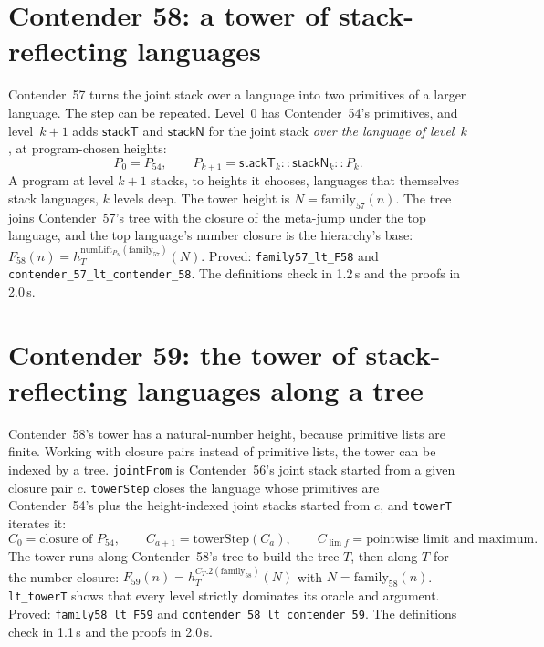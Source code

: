 \documentclass[11pt]{article}
\theoremstyle{definition}
\theoremstyle{remark}
\newcommand{\lean}[1]{\texttt{#1}}
\begin{document}
\section{Contender 58: a tower of stack-reflecting languages}

Contender~57 turns the joint stack over a language into two primitives of a
larger language. The step can be repeated. Level~0 has Contender~54's
primitives, and level~$k{+}1$ adds $\mathsf{stackT}$ and $\mathsf{stackN}$
for the joint stack \emph{over the language of level~$k$}, at program-chosen
heights:
\[
P_0=P_{54},\qquad P_{k+1}=\mathsf{stackT}_k::\mathsf{stackN}_k::P_k .
\]
A program at level $k{+}1$ stacks, to heights it chooses, languages that
themselves stack languages, $k$ levels deep. The tower height is
$N=\mathrm{family}_{57}(n)$. The tree joins Contender~57's tree with the closure
of the meta-jump under the top language, and the top language's number
closure is the hierarchy's base:
$F_{58}(n)=h^{\mathrm{numLift}_{P_N}(\mathrm{family}_{57})}_{T}(N)$. Proved:
\lean{family57\_lt\_F58} and \lean{contender\_57\_lt\_\allowbreak contender\_58}.
The definitions check in 1.2\,s and the proofs in 2.0\,s.

\section{Contender 59: the tower of stack-reflecting languages along a tree}

Contender~58's tower has a natural-number height, because primitive lists are
finite. Working with closure pairs instead of primitive lists, the tower can be
indexed by a tree. \lean{jointFrom} is Contender~56's joint stack started from a
given closure pair $c$. \lean{towerStep} closes the language whose primitives are
Contender~54's plus the height-indexed joint stacks started from $c$, and
\lean{towerT} iterates it:
\[
C_0=\text{closure of }P_{54},\qquad C_{a+1}=\mathrm{towerStep}(C_a),\qquad
C_{\lim f}=\text{pointwise limit and maximum}.
\]
The tower runs along Contender~58's tree to build the tree $T$, then along $T$
for the number closure:
$F_{59}(n)=h^{C_T.2(\mathrm{family}_{58})}_T(N)$ with
$N=\mathrm{family}_{58}(n)$. \lean{lt\_towerT} shows that every level strictly
dominates its oracle and argument. Proved: \lean{family58\_lt\_F59} and
\lean{contender\_58\_lt\_\allowbreak contender\_59}. The definitions check in
1.1\,s and the proofs in 2.0\,s.
\end{document}

